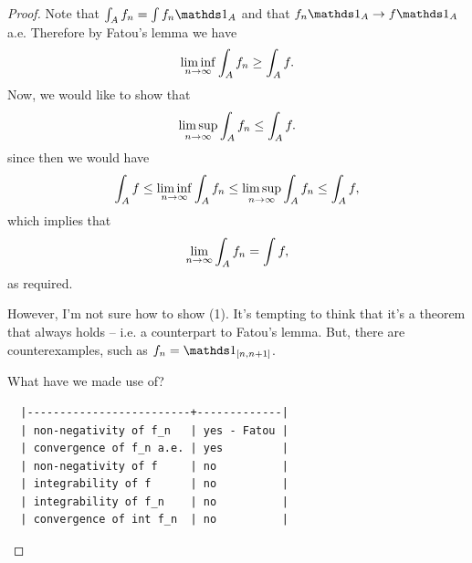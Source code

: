 \begin{proof}
  Note that $\int_A f_n = \int f_n\ind_A$ and that $f_n\ind_A \to f\ind_A$ a.e. Therefore by Fatou's lemma we have
  \begin{align*}
    \liminfn \int_A f_n \geq \int_A f.
  \end{align*}
  Now, we would like to show that
  \begin{align}
    \limsupn \int_A f_n \leq \int_A f.
  \end{align}
  since then we would have
  \begin{align*}
    \int_A f \leq \liminfn \int_A f_n \leq \limsupn \int_A f_n \leq \int_A f,
  \end{align*}
  which implies that
  \begin{align*}
    \limn \int_A f_n = \int f,
  \end{align*}
  as required.

  However, I'm not sure how to show (1). It's tempting to think that it's a theorem that always holds -- i.e. a
  counterpart to Fatou's lemma. But, there are counterexamples, such as $f_n = \ind_{[n, n+1]}$.

  What have we made use of?
\begin{verbatim}
  |-------------------------+-------------|
  | non-negativity of f_n   | yes - Fatou |
  | convergence of f_n a.e. | yes         |
  | non-negativity of f     | no          |
  | integrability of f      | no          |
  | integrability of f_n    | no          |
  | convergence of int f_n  | no          |
\end{verbatim}
\end{proof}


